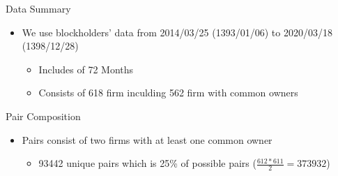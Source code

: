 \documentclass{beamer}
\begin{document}
		
		
			\begin{frame}{Data Summary}
			\begin{itemize}
				\item We use blockholders' data from 2014/03/25 \scriptsize{(1393/01/06)} \normalsize to 2020/03/18 \scriptsize (1398/12/28)  \normalsize
				\begin{itemize}
					\item Includes of 72 Months
					\item Consists of 618 firm inculding 562 firm with common owners
					
				\end{itemize}
			\end{itemize}
			
			\begin{table}[htbp]
				\centering
				\resizebox{0.8\textwidth}{!}
				{
					
				}
			\end{table}
			
		\end{frame}
		
		
		
		\begin{frame}{Pair Composition}
			\begin{itemize}
			
				\item Pairs consist of two firms  with at least one common owner
				\begin{itemize}
					\item  93442 unique pairs which is 25\% of possible pairs 
					\tiny ($ \frac{612*611}{2}= 373932 $)
					\normalsize
				\end{itemize}
			\end{itemize}
			
			\begin{table}[htbp]
				\centering
				{
					\footnotesize
				
					
				}
			\end{table}
			
			
			\begin{table}
				\resizebox{0.7\textwidth}{!}
				{
					
				}
			\end{table}%
			
		\end{frame}  
		
		
		
	
		
\end{document}
